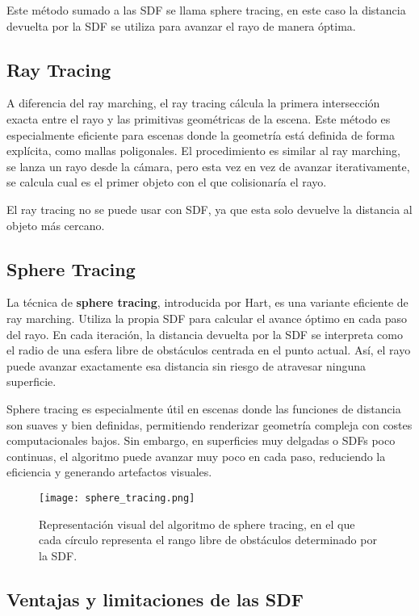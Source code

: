 Este método sumado a las SDF se llama sphere tracing, en este caso la distancia devuelta por la SDF se utiliza para avanzar el rayo de manera óptima.

\subsection{Ray Tracing}

A diferencia del ray marching, el ray tracing cálcula la primera intersección exacta entre el rayo y las primitivas geométricas de la escena. 
Este método es especialmente eficiente para escenas donde la geometría está definida de forma explícita, como mallas poligonales.
El procedimiento es similar al ray marching, se lanza un rayo desde la cámara, pero esta vez en vez de avanzar iterativamente,
se calcula cual es el primer objeto con el que colisionaría el rayo.

El ray tracing no se puede usar con SDF, ya que esta solo devuelve la distancia al objeto más cercano.

\subsection{Sphere Tracing}

La técnica de \textbf{sphere tracing}, introducida por Hart, es una variante
eficiente de ray marching. Utiliza la propia SDF para calcular el avance óptimo
en cada paso del rayo. En cada iteración, la distancia devuelta por la SDF se
interpreta como el radio de una esfera libre de obstáculos centrada en el punto
actual. Así, el rayo puede avanzar exactamente esa distancia sin riesgo de
atravesar ninguna superficie.

Sphere tracing es especialmente útil en escenas donde las funciones de
distancia son suaves y bien definidas, permitiendo renderizar geometría
compleja con costes computacionales bajos. Sin embargo, en superficies muy
delgadas o SDFs poco continuas, el algoritmo puede avanzar muy poco en cada
paso, reduciendo la eficiencia y generando artefactos visuales.

\begin{figure}[H]
    \centering
    \texttt{[image: sphere\_tracing.png]}
    \caption{Representación visual del algoritmo de sphere tracing, en el que cada círculo representa el rango libre de obstáculos determinado por la SDF.}
    \label{fig:sphere-tracing}
\end{figure}

\subsection{Ventajas y limitaciones de las SDF}

